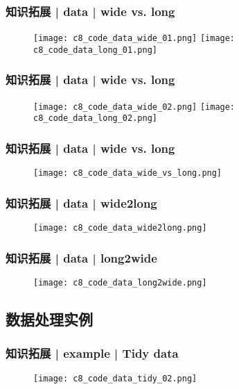 \begin{frame}
  \frametitle{知识拓展 | data | wide vs. long}
  \begin{figure}
    \centering
    \texttt{[image: c8\_code\_data\_wide\_01.png]}
    \texttt{[image: c8\_code\_data\_long\_01.png]}
  \end{figure}
\end{frame}

\begin{frame}
  \frametitle{知识拓展 | data | wide vs. long}
  \begin{figure}
    \centering
    \texttt{[image: c8\_code\_data\_wide\_02.png]}
    \quad
    \texttt{[image: c8\_code\_data\_long\_02.png]}
  \end{figure}
\end{frame}

\begin{frame}
  \frametitle{知识拓展 | data | wide vs. long}
  \begin{figure}
    \centering
    \texttt{[image: c8\_code\_data\_wide\_vs\_long.png]}
  \end{figure}
\end{frame}

\begin{frame}
  \frametitle{知识拓展 | data | wide2long}
  \begin{figure}
    \centering
    \texttt{[image: c8\_code\_data\_wide2long.png]}
  \end{figure}
\end{frame}

\begin{frame}
  \frametitle{知识拓展 | data | long2wide}
  \begin{figure}
    \centering
    \texttt{[image: c8\_code\_data\_long2wide.png]}
  \end{figure}
\end{frame}

\subsection{数据处理实例}
\begin{frame}
  \frametitle{知识拓展 | example | Tidy data}
  \begin{figure}
    \centering
    \texttt{[image: c8\_code\_data\_tidy\_02.png]}
  \end{figure}
\end{frame}

